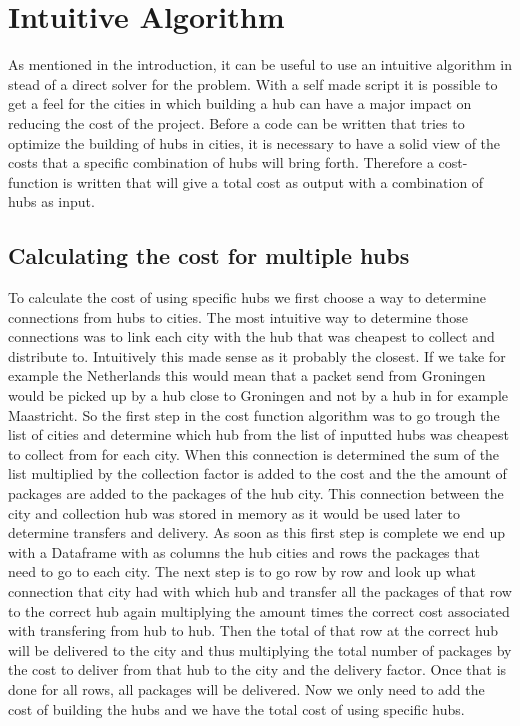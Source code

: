 \documentclass{article}
\begin{document}
\newpage
\section{Intuitive Algorithm}
As mentioned in the introduction, it can be useful to use an intuitive algorithm in stead of a direct solver for the problem. With a self made script it is possible to get a feel for the cities in which building a hub can have a major impact on reducing the cost of the project. 
Before a code can be written that tries to optimize the building of hubs in cities, it is necessary to have a solid view of the costs that a specific combination of hubs will bring forth. Therefore a cost-function is written that will give a total cost as output with a combination of hubs as input. 



    \subsection{Calculating the cost for multiple hubs}
        To calculate the cost of using specific hubs we first choose a way to determine connections from hubs to cities. The most intuitive way to determine those connections was to link each city with the hub that was cheapest to collect and distribute to. Intuitively this made sense as it probably the closest. If we take for example the Netherlands this would mean that a packet send from Groningen would be picked up by a hub close to Groningen and not by a hub in for example Maastricht. So the first step in the cost function algorithm was to go trough the list of cities and determine which hub from the list of inputted hubs was cheapest to collect from for each city. When this connection is determined the sum of the list multiplied by the collection factor is added to the cost and the the amount of packages are added to the packages of the hub city. This connection between the city and collection hub was stored in memory as it would be used later to determine transfers and delivery. As soon as this first step is complete we end up with a Dataframe with as columns the hub cities and rows the packages that need to go to each city. The next step is to go row by row and look up what connection that city had with which hub and transfer all the packages of that row to the correct hub again multiplying the amount times the correct cost associated with transfering from hub to hub. Then the total of that row at the correct hub will be delivered to the city and thus multiplying the total number of packages by the cost to deliver from that hub to the city and the delivery factor. Once that is done for all rows, all packages will be delivered. Now we only need to add the cost of building the hubs and we have the total cost of using specific hubs. 
        
\end{document}
